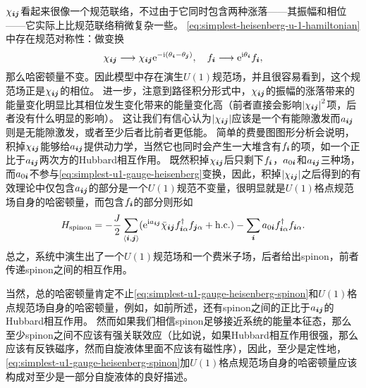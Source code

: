 $\chi_{\vb*{i} \vb*{j}}$看起来很像一个规范联络，不过由于它同时包含两种涨落——其振幅和相位——它实际上比规范联络稍微复杂一些。
\eqref{eq:simplest-heisenberg-u-1-hamiltonian}中存在规范对称性：做变换
\begin{equation}
    \chi_{\vb*{i} \vb*{j}} \longrightarrow \chi_{\vb*{i} \vb*{j}} \mathrm{e}^{- \mathrm{i} (\theta_{\vb*{i}} - \theta_{\vb*{j}})}, \quad f_{\vb*{i}} \longrightarrow \mathrm{e}^{\mathrm{i} \theta_{\vb*{i}}} f_{\vb*{i}},
    \label{eq:simplest-u1-gauge-heisenberg}
\end{equation}
那么哈密顿量不变。因此模型中存在演生$U(1)$规范场，并且很容易看到，这个规范场正是$\chi_{\vb*{i} \vb*{j}}$的相位。
进一步，注意到路径积分形式中，$\chi_{\vb*{i} \vb*{j}}$的振幅的涨落带来的能量变化明显比其相位发生变化带来的能量变化高（前者直接会影响$\abs{\chi_{\vb*{i} \vb*{j}}}^2$项，后者没有什么明显的影响）。
这让我们有信心认为$\abs{\chi_{\vb*{i} \vb*{j}}}$应该是一个有能隙激发而$a_{\vb*{i} \vb*{j}}$则是无能隙激发，或者至少后者比前者更低能。
简单的费曼图图形分析会说明，积掉$\chi_{\vb*{i} \vb*{j}}$能够给$a_{\vb*{i} \vb*{j}}$提供动力学，当然它也同时会产生一大堆含有$f_{\vb*{i}}$的项，如一个正比于$a_{\vb*{i} \vb*{j}}$两次方的Hubbard相互作用。
既然积掉$\chi_{\vb*{i} \vb*{j}}$后只剩下$f_{\vb*{i}}$，$a_{0 \vb*{i}}$和$a_{\vb*{i} \vb*{j}}$三种场，而$a_{0 \vb*{i}}$不参与\eqref{eq:simplest-u1-gauge-heisenberg}变换，因此，积掉$\abs{\chi_{\vb*{i} \vb*{j}}}$之后得到的有效理论中仅包含$a_{\vb*{i} \vb*{j}}$的部分是一个$U(1)$规范不变量，很明显就是$U(1)$格点规范场自身的哈密顿量，而包含$f_{\vb*{i}}$的部分则形如
\begin{equation}
    H_\text{spinon} = - \frac{J}{2} \sum_{\langle \vb*{i}, \vb*{j} \rangle} (\mathrm{e}^{\mathrm{i} a_{\vb*{i} \vb*{j}}} \bar{\chi}_{\vb*{i} \vb*{j}} {f}^\dagger_{\vb*{i} \alpha} f_{\vb*{j} \alpha} + \text{h.c.} ) - \sum_{\vb*{i}} a_{0 \vb*{i}} f^\dagger_{\vb*{i} \alpha} f_{\vb*{i} \alpha}.
    \label{eq:simplest-u1-gauge-heisenberg-spinon}
\end{equation}
总之，系统中演生出了一个$U(1)$规范场和一个费米子场，后者给出spinon，前者传递spinon之间的相互作用。

当然，总的哈密顿量肯定不止\eqref{eq:simplest-u1-gauge-heisenberg-spinon}和$U(1)$格点规范场自身的哈密顿量，例如，如前所述，还有spinon之间的正比于$a_{\vb*{i} \vb*{j}}$的Hubbard相互作用。
然而如果我们相信spinon足够接近系统的能量本征态，那么至少spinon之间不应该有强关联效应（比如说，如果Hubbard相互作用很强，那么应该有反铁磁序，然而自旋液体里面不应该有磁性序），因此，至少是定性地，\eqref{eq:simplest-u1-gauge-heisenberg-spinon}加$U(1)$格点规范场自身的哈密顿量应该构成对至少是一部分自旋液体的良好描述。

